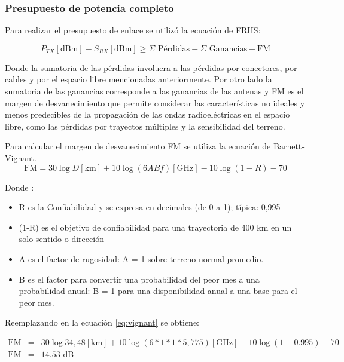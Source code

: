 \documentclass[11pt,a4paper]{article}
\begin{document}
\subsubsection{Presupuesto de potencia completo}
  
Para realizar el presupuesto de enlace se utilizó la ecuación de FRIIS:

\begin{equation}
  P_{TX}[\text{dBm}]-S_{RX}[\text{dBm}] \geq \Sigma \text{ Pérdidas} -\Sigma\text{ Ganancias} + \text{FM}
  \label{eq:friis} 
\end{equation}



Donde la sumatoria de las pérdidas involucra a las pérdidas por conectores, por cables y por el espacio libre  mencionadas anteriormente. 
Por otro lado la sumatoria de las ganancias corresponde a las ganancias de las antenas y FM es el margen de desvanecimiento que permite considerar las características no ideales y menos predecibles de la propagación de las ondas radioeléctricas en el espacio libre, como las pérdidas por trayectos múltiples y la sensibilidad del terreno.

Para calcular el margen de desvanecimiento FM se utiliza la ecuación de Barnett-Vignant.
\begin{equation}
  \text{FM}=30\log{D}[\text{km}]+10\log{(6ABf)}[\text{GHz}]-10\log{(1-R)}-70
  \label{eq:vignant}
\end{equation}

Donde :

\begin{itemize}
\item   R es la Confiabilidad y se expresa en decimales (de 0 a 1); típica: 0,995
\item  (1-R) es el objetivo de confiabilidad para una trayectoria de 400 km en un solo sentido o dirección
\item   A es el factor de rugosidad: A = 1 sobre terreno normal promedio.
\item   B es el factor para convertir una probabilidad del peor mes a una probabilidad anual: B = 1 para una disponibilidad anual a una base para el peor mes.
\end{itemize}

Reemplazando en la ecuación \ref{eq:vignant} se obtiene: 

\begin{eqnarray}
  \text{FM}&=&30\log{34,48}[\text{km}]+10\log{(6*1*1*5,775)}[\text{GHz}]-10\log{(1-0.995)}-70 \nonumber\\
  \text{FM}&=&14.53\text{ dB}
  \label{eq:res_vignant}
\end{eqnarray}
\end{document}
